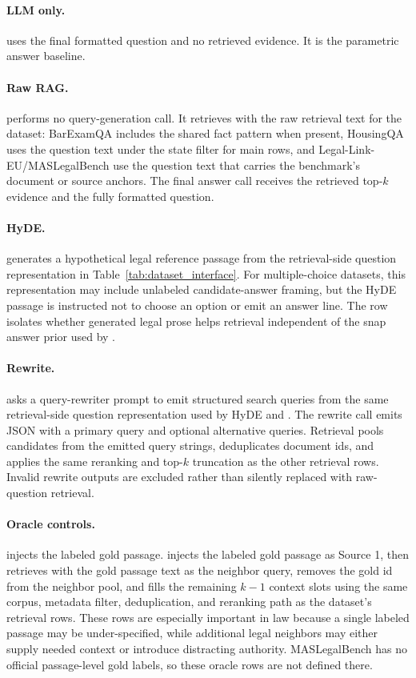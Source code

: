\paragraph{LLM only.}
 uses the final formatted question and no retrieved evidence.
It is the parametric answer baseline.

\paragraph{Raw RAG.}
 performs no query-generation call. It retrieves with the
raw retrieval text for the dataset: BarExamQA includes the shared fact pattern
when present, HousingQA uses the question text under the state filter for main
rows, and Legal-Link-EU/MASLegalBench use the question text that carries the
benchmark's document or source anchors. The final answer call receives the
retrieved top-$k$ evidence and the fully formatted question.

\paragraph{HyDE.}
 generates a hypothetical legal reference passage from the
retrieval-side question representation in Table~\ref{tab:dataset_interface}.
For multiple-choice datasets, this representation may include unlabeled
candidate-answer framing, but the HyDE passage is instructed not to choose an
option or emit an answer line. The row isolates whether generated legal prose
helps retrieval independent of the snap answer prior used by \hyre{}.

\paragraph{Rewrite.}
 asks a query-rewriter prompt to emit structured search
queries from the same retrieval-side question representation used by HyDE and
\hyre{}. The rewrite call emits JSON with a primary query and optional
alternative queries. Retrieval pools candidates from the emitted query strings,
deduplicates document ids, and applies the same reranking and top-$k$ truncation
as the other retrieval rows. Invalid rewrite outputs are excluded rather than
silently replaced with raw-question retrieval.

\paragraph{Oracle controls.}
 injects the labeled gold passage. 
injects the labeled gold passage as Source 1, then retrieves with the gold
passage text as the neighbor query, removes the gold id from the neighbor pool,
and fills the remaining $k-1$ context slots using the same corpus, metadata
filter, deduplication, and reranking path as the dataset's retrieval rows. These
rows are especially important in law because a single labeled passage may be
under-specified, while additional legal neighbors may either supply needed
context or introduce distracting authority. MASLegalBench has no official
passage-level gold labels, so these oracle rows are not defined there.

